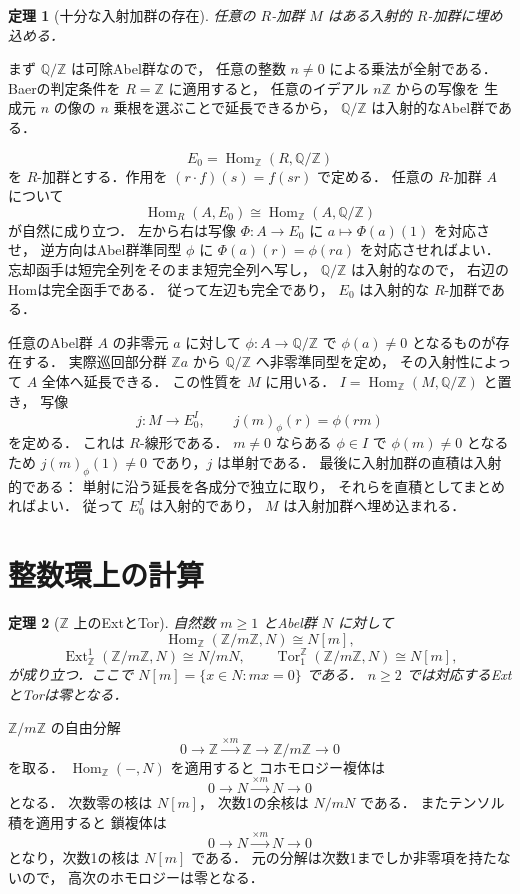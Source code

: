 \documentclass[a5paper,10pt,onecolumn]{jsarticle}
\makeatletter
\theoremstyle{mathnotetheorem}
\newtheorem{theorem}{定理}[section]
\renewcommand{\proofname}{証明}
\renewenvironment{proof}[1][\proofname]{%
  \par\pushQED{\qed}\normalfont\topsep4\p@\@plus2\p@\relax
  \trivlist\item[\hskip\labelsep\bfseries #1]\ignorespaces
}{\popQED\endtrivlist\@endpefalse}
\makeatother
\begin{document}
\begin{theorem}[十分な入射加群の存在]\label{thm:enough-inj}
任意の $R$-加群 $M$ はある入射的 $R$-加群に埋め込める．
\end{theorem}
\begin{proof}
まず $\mathbb Q/\mathbb Z$ は可除Abel群なので，
任意の整数 $n\ne0$ による乗法が全射である．
Baerの判定条件を $R=\mathbb Z$ に適用すると，
任意のイデアル $n\mathbb Z$ からの写像を
生成元 $n$ の像の $n$ 乗根を選ぶことで延長できるから，
$\mathbb Q/\mathbb Z$ は入射的なAbel群である．

\[
 E_0=\operatorname{Hom}_{\mathbb Z}(R,\mathbb Q/\mathbb Z)
\]
を $R$-加群とする．作用を
$(r\cdot f)(s)=f(sr)$ で定める．
任意の $R$-加群 $A$ について
\[
 \operatorname{Hom}_R(A,E_0)
 \cong\operatorname{Hom}_{\mathbb Z}(A,\mathbb Q/\mathbb Z)
\]
が自然に成り立つ．
左から右は写像 $\Phi:A\to E_0$ に
$a\mapsto\Phi(a)(1)$ を対応させ，
逆方向はAbel群準同型 $\phi$ に
$\Phi(a)(r)=\phi(ra)$ を対応させればよい．
忘却函手は短完全列をそのまま短完全列へ写し，
$\mathbb Q/\mathbb Z$ は入射的なので，
右辺のHomは完全函手である．
従って左辺も完全であり，
$E_0$ は入射的な $R$-加群である．

任意のAbel群 $A$ の非零元 $a$ に対して
$\phi:A\to\mathbb Q/\mathbb Z$ で
$\phi(a)\ne0$ となるものが存在する．
実際巡回部分群 $\mathbb Za$ から
$\mathbb Q/\mathbb Z$ へ非零準同型を定め，
その入射性によって $A$ 全体へ延長できる．
この性質を $M$ に用いる．
$I=\operatorname{Hom}_{\mathbb Z}(M,\mathbb Q/\mathbb Z)$ と置き，
写像
\[
 j:M\to E_0^I,\qquad
 j(m)_\phi(r)=\phi(rm)
\]
を定める．
これは $R$-線形である．
$m\ne0$ ならある $\phi\in I$ で
$\phi(m)\ne0$ となるため
$j(m)_\phi(1)\ne0$ であり，$j$ は単射である．
最後に入射加群の直積は入射的である：
単射に沿う延長を各成分で独立に取り，
それらを直積としてまとめればよい．
従って $E_0^I$ は入射的であり，
$M$ は入射加群へ埋め込まれる．
\end{proof}

\section{整数環上の計算}

\begin{theorem}[$\mathbb Z$ 上のExtとTor]
\label{thm:z-example}
自然数 $m\ge1$ とAbel群 $N$ に対して
\[
 \operatorname{Hom}_{\mathbb Z}(\mathbb Z/m\mathbb Z,N)
 \cong N[m],
\]
\[
 \operatorname{Ext}_{\mathbb Z}^1(\mathbb Z/m\mathbb Z,N)
 \cong N/mN,
 \qquad
 \operatorname{Tor}^{\mathbb Z}_1(\mathbb Z/m\mathbb Z,N)
 \cong N[m],
\]
が成り立つ．ここで $N[m]=\{x\in N:mx=0\}$ である．
$n\ge2$ では対応するExtとTorは零となる．
\end{theorem}
\begin{proof}
$\mathbb Z/m\mathbb Z$ の自由分解
\[
 0\to\mathbb Z\xrightarrow{\times m}\mathbb Z
 \to\mathbb Z/m\mathbb Z\to0
\]
を取る．
$\operatorname{Hom}_{\mathbb Z}(-,N)$ を適用すると
コホモロジー複体は
\[
 0\to N\xrightarrow{\times m}N\to0
\]
となる．
次数零の核は $N[m]$，
次数1の余核は $N/mN$ である．
またテンソル積を適用すると
鎖複体は
\[
 0\to N\xrightarrow{\times m}N\to0
\]
となり，次数1の核は $N[m]$ である．
元の分解は次数1までしか非零項を持たないので，
高次のホモロジーは零となる．
\end{proof}
\end{document}
